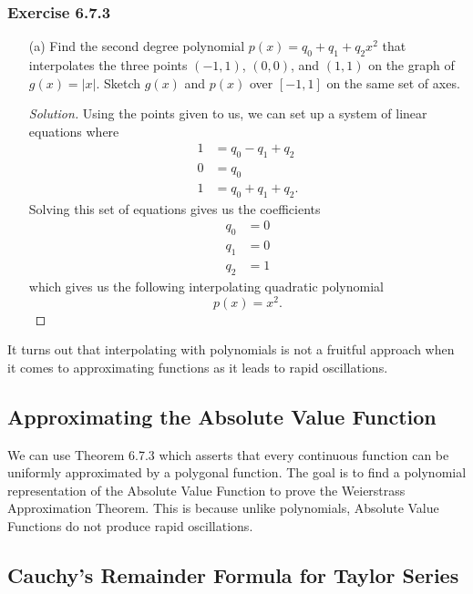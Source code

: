 \subsubsection{Exercise 6.7.3} 
\begin{enumerate}
    \item[(a)] Find the second degree polynomial \( p(x) = q_{0} + q_{1} + q_{2}x^{2} \) that interpolates the three points \( (-1,1) \), \( (0,0) \), and \( (1,1) \) on the graph of \( g(x) = | x  |  \). Sketch \( g(x)  \) and \( p(x)  \) over \( [-1,1] \) on the same set of axes.
        \begin{proof}[Solution]
        Using the points given to us, we can set up a system of linear equations where 
        \begin{align*}
            1 &= q_{0} - q_{1} + q_{2} \\
            0 &= q_{0} \\
            1 &= q_{0} + q_{1} + q_{2}.
        \end{align*}
        Solving this set of equations gives us the coefficients 
        \begin{align*}
            q_{0} &= 0  \\
            q_{1} &= 0 \\
            q_{2} &= 1
        \end{align*}
        which gives us the following interpolating quadratic polynomial 
        \[  p(x) = x^2. \]
        \end{proof}
\end{enumerate}

It turns out that interpolating with polynomials is not a fruitful approach when it comes to approximating functions as it leads to rapid oscillations.

\subsection{Approximating the Absolute Value Function}

We can use Theorem 6.7.3 which asserts that every continuous function can be uniformly approximated by a polygonal function. The goal is to find a polynomial representation of the Absolute Value Function to prove the Weierstrass Approximation Theorem. This is because unlike polynomials, Absolute Value Functions do not produce rapid oscillations. 

\subsection{Cauchy's Remainder Formula for Taylor Series} 

